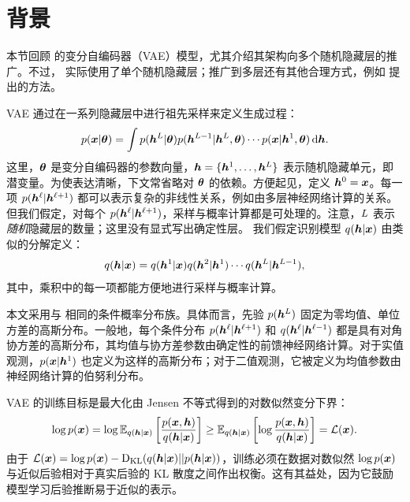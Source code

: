 \section{背景}
\label{sec:background}

本节回顾 \citet{vae} 的变分自编码器（VAE）模型，尤其介绍其架构向多个随机隐藏层的推广。不过，\citet{vae} 实际使用了单个随机隐藏层；推广到多层还有其他合理方式，例如 \citet{vae2} 提出的方法。

VAE 通过在一系列隐藏层中进行祖先采样来定义生成过程：
\begin{equation}
p(\bm{x}|{\bm{\theta}}) = \int p(\bm{h}^{L}|{\bm{\theta}}) p(\bm{h}^{L-1}|\bm{h}^{L},{\bm{\theta}})\cdots p(\bm{x}|\bm{h}^{1},{\bm{\theta}})\,\mathrm{d}\bm{h}.\label{eq:source-01}
\end{equation}
这里，${\bm{\theta}}$ 是变分自编码器的参数向量，$\bm{h}=\{\bm{h}^{1},\ldots,\bm{h}^{L}\}$ 表示随机隐藏单元，即潜变量。为使表达清晰，下文常省略对 ${\bm{\theta}}$ 的依赖。方便起见，定义 $\bm{h}^{0}=\bm{x}$。每一项 $p(\bm{h}^{\ell}|\bm{h}^{\ell+1})$ 都可以表示复杂的非线性关系，例如由多层神经网络计算的关系。但我们假定，对每个 $p(\bm{h}^{\ell}|\bm{h}^{\ell+1})$，采样与概率计算都是可处理的。注意，$L$ 表示\emph{随机}隐藏层的数量；这里没有显式写出确定性层。
我们假定识别模型 $q(\bm{h}|\bm{x})$ 由类似的分解定义：
\begin{equation}
q(\bm{h}|\bm{x})=q(\bm{h}^{1}|\bm{x})q(\bm{h}^{2}|\bm{h}^{1})\cdots q(\bm{h}^{L}|\bm{h}^{L-1}),\label{eq:source-02}
\end{equation}
其中，乘积中的每一项都能方便地进行采样与概率计算。

本文采用与 \citet{vae} 相同的条件概率分布族。具体而言，先验 $p(\bm{h}^{L})$ 固定为零均值、单位方差的高斯分布。一般地，每个条件分布 $p(\bm{h}^{\ell}|\bm{h}^{\ell+1})$ 和 $q(\bm{h}^{\ell}|\bm{h}^{\ell-1})$ 都是具有对角协方差的高斯分布，其均值与协方差参数由确定性的前馈神经网络计算。对于实值观测，$p(\bm{x}|\bm{h}^{1})$ 也定义为这样的高斯分布；对于二值观测，它被定义为均值参数由神经网络计算的伯努利分布。

VAE 的训练目标是最大化由 Jensen 不等式得到的对数似然变分下界：
\begin{equation}
\log p(\bm{x}) = \log \mathbb{E}_{q(\bm{h}|\bm{x})}\left[\frac{p(\bm{x},\bm{h})}{q(\bm{h}|\bm{x})}\right]\geq \mathbb{E}_{q(\bm{h}|\bm{x})}\left[\log\frac{p(\bm{x},\bm{h})}{q(\bm{h}|\bm{x})}\right] = \mathcal{L}(\bm{x}). \label{eqn:vae_bound}
\end{equation}
由于 $\mathcal{L}(\bm{x})=\log p(\bm{x})-\mathrm{D}_{\mathrm{KL}}(q(\bm{h}|\bm{x})||p(\bm{h}|\bm{x}))$，训练必须在数据对数似然 $\log p(\bm{x})$ 与近似后验相对于真实后验的 KL 散度之间作出权衡。这有其益处，因为它鼓励模型学习后验推断易于近似的表示。

